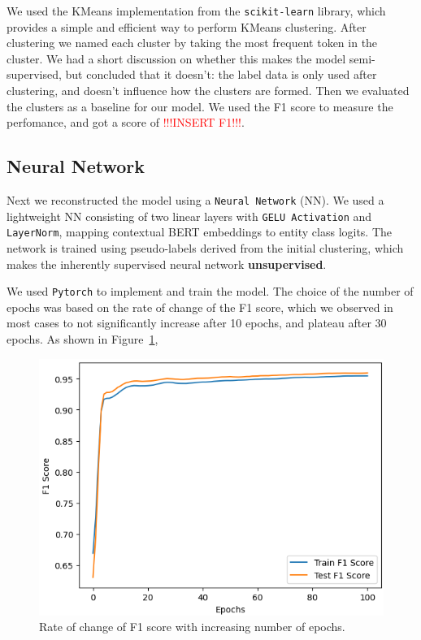 \documentclass[11pt]{article}
\begin{document}
We used the KMeans implementation from the \texttt{scikit-learn} library, which provides a simple and efficient way to perform KMeans clustering.
After clustering we named each cluster by taking the most frequent token in the cluster. We had a short discussion on whether this makes the model
semi-supervised, but concluded that it doesn't: the label data is only used after clustering, and doesn't influence how the clusters are formed.
Then we evaluated the clusters as a baseline for our model. We used the F1 score to measure the perfomance, and got a score of
\textcolor{red}{!!!INSERT F1!!!}.

\subsection{Neural Network}

Next we reconstructed the model using a \texttt{Neural Network} (NN). We used a lightweight NN consisting of two linear layers with
\texttt{GELU Activation} and \texttt{LayerNorm}, mapping contextual BERT embeddings to entity class logits. The network is trained using
pseudo-labels derived from the initial clustering, which makes the inherently supervised neural network \textbf{unsupervised}.

We used \texttt{Pytorch} to implement and train the model. The choice of the number of epochs was based on the rate of change of the F1 score,
which we observed in most cases to not significantly increase after 10 epochs, and plateau after 30 epochs. As shown in Figure~\ref{fig:F1-Epochs},

\begin{figure}[H]
  \includegraphics[width=\columnwidth]{F1-Epochs.png}
  \caption{Rate of change of F1 score with increasing number of epochs.}
  \label{fig:F1-Epochs}
\end{figure}
\end{document}
